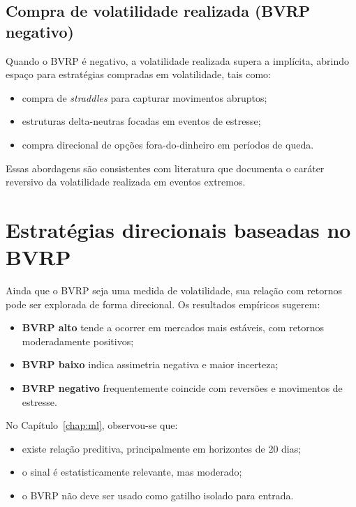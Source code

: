\subsection{Compra de volatilidade realizada (BVRP negativo)}

Quando o BVRP é negativo, a volatilidade realizada supera a implícita, abrindo
espaço para estratégias compradas em volatilidade, tais como:

\begin{itemize}
    \item compra de \textit{straddles} para capturar movimentos abruptos;
    \item estruturas delta-neutras focadas em eventos de estresse;
    \item compra direcional de opções fora-do-dinheiro em períodos de queda.
\end{itemize}

Essas abordagens são consistentes com literatura que documenta o caráter
reversivo da volatilidade realizada em eventos extremos.

\section{Estratégias direcionais baseadas no BVRP}

Ainda que o BVRP seja uma medida de volatilidade, sua relação com retornos pode
ser explorada de forma direcional. Os resultados empíricos sugerem:

\begin{itemize}
    \item \textbf{BVRP alto} tende a ocorrer em mercados mais estáveis, com retornos
          moderadamente positivos;
    \item \textbf{BVRP baixo} indica assimetria negativa e maior incerteza;
    \item \textbf{BVRP negativo} frequentemente coincide com reversões e movimentos
          de estresse.
\end{itemize}

No Capítulo~\ref{chap:ml}, observou-se que:

\begin{itemize}
    \item existe relação preditiva, principalmente em horizontes de 20 dias;
    \item o sinal é estatisticamente relevante, mas moderado;
    \item o BVRP não deve ser usado como gatilho isolado para entrada.
\end{itemize}


